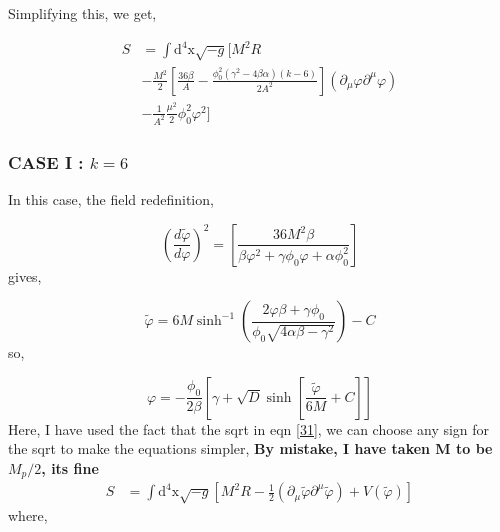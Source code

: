 \documentclass{article}
\begin{document}
Simplifying this, we get,


\begin{equation} 
    \begin{aligned}
        S &= \int \text{d}^4\text{x} \sqrt{-g} [ M^2 R \\
        &- \frac{M^2}{2} \left[\frac{36 \beta}{A} - \frac{\phi_0^2 (\gamma^2 - 4\beta\alpha)(k-6)}{2 A^2}\right] (\partial_\mu \varphi \partial^\mu \varphi) \\
        &-  \frac{1}{A^2} \frac{\mu^2}{2} \phi^2_0 \varphi^2 ] 
    \end{aligned}
\end{equation}

\subsubsection{CASE I : $k = 6$}
In this case, the field redefinition,

\begin{equation} \label{31}
    \left(\frac{d\tilde{\varphi}}{d\varphi} \right)^2 = \left[ \frac{36M^2 \beta}{\beta \varphi^2  +\gamma \phi_0 \varphi +\alpha \phi^2_0} \right]
\end{equation}
gives, 

\begin{equation}
    \tilde{\varphi} = 6M \sinh^{-1} \left(\frac{2\varphi\beta+\gamma\phi_0}{\phi_0 \sqrt{4\alpha\beta -\gamma^2}} \right) - C
\end{equation}
so,

\begin{equation}
    \varphi = -\frac{\phi_0}{2 \beta} \left[ \gamma + \sqrt{D}\sinh[\frac{\tilde{\varphi}}{6M} + C] \right]
\end{equation}
Here, I have used the fact that the sqrt in eqn \ref{31}, we can choose any sign for the sqrt to make the equations simpler,
\textbf{By mistake, I have taken M to be $M_p/2$, its fine}
\begin{equation} 
    \begin{aligned}
        S &= \int \text{d}^4\text{x} \sqrt{-g} [ M^2 R - \frac{1}{2}  (\partial_\mu \tilde{\varphi} \partial^\mu \tilde{\varphi}) + V(\tilde{\varphi}) ] 
    \end{aligned}
\end{equation}
where,

\end{document}
